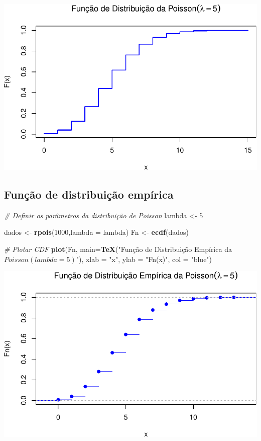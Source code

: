 \documentclass[
]{book}
\newenvironment{Shaded}{\begin{snugshade}}{\end{snugshade}}
\newcommand{\AttributeTok}[1]{\textcolor[rgb]{0.13,0.29,0.53}{#1}}
\newcommand{\CommentTok}[1]{\textcolor[rgb]{0.56,0.35,0.01}{\textit{#1}}}
\newcommand{\DecValTok}[1]{\textcolor[rgb]{0.00,0.00,0.81}{#1}}
\newcommand{\FunctionTok}[1]{\textcolor[rgb]{0.13,0.29,0.53}{\textbf{#1}}}
\newcommand{\NormalTok}[1]{#1}
\newcommand{\OtherTok}[1]{\textcolor[rgb]{0.56,0.35,0.01}{#1}}
\newcommand{\StringTok}[1]{\textcolor[rgb]{0.31,0.60,0.02}{#1}}
\theoremstyle{definition}
\theoremstyle{definition}
\theoremstyle{definition}
\theoremstyle{definition}
\theoremstyle{remark}
\begin{document}
\includegraphics{meuLivro2_files/figure-latex/unnamed-chunk-116-1.pdf}

\subsection{Função de distribuição empírica}\label{funuxe7uxe3o-de-distribuiuxe7uxe3o-empuxedrica-2}

\begin{Shaded}
\begin{Highlighting}[]
\CommentTok{\# Definir os parâmetros da distribuição de Poisson}
\NormalTok{lambda }\OtherTok{\textless{}{-}} \DecValTok{5}

\NormalTok{dados }\OtherTok{\textless{}{-}} \FunctionTok{rpois}\NormalTok{(}\DecValTok{1000}\NormalTok{,}\AttributeTok{lambda =}\NormalTok{ lambda)}
\NormalTok{Fn }\OtherTok{\textless{}{-}} \FunctionTok{ecdf}\NormalTok{(dados)}

\CommentTok{\# Plotar CDF}
\FunctionTok{plot}\NormalTok{(Fn, }\AttributeTok{main=}\FunctionTok{TeX}\NormalTok{(}\StringTok{"Função de Distribuição Empírica da $Poisson(lambda = 5)$"}\NormalTok{),}
  \AttributeTok{xlab =} \StringTok{"x"}\NormalTok{,     }
  \AttributeTok{ylab =} \StringTok{"Fn(x)"}\NormalTok{,      }
  \AttributeTok{col =} \StringTok{"blue"}\NormalTok{)}
\end{Highlighting}
\end{Shaded}

\includegraphics{meuLivro2_files/figure-latex/unnamed-chunk-117-1.pdf}
\end{document}
